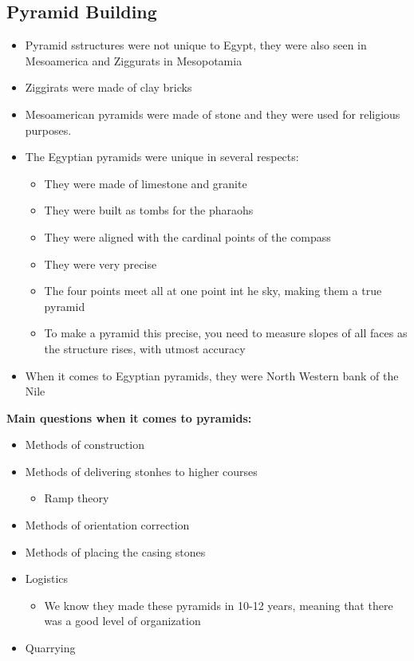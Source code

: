 \documentclass{article}
\begin{document}
\subsection{Pyramid Building}
\begin{itemize}
  \item Pyramid sstructures were not unique to Egypt,
    they were also seen in Mesoamerica and
    Ziggurats in Mesopotamia
  \item Ziggirats were made of clay bricks
  \item Mesoamerican pyramids were made of stone
    and they were used for religious purposes.
  \item The Egyptian pyramids were unique in several respects:
    \begin{itemize}
      \item They were made of limestone and granite
      \item They were built as tombs for the pharaohs
      \item They were aligned with the cardinal points of the compass
      \item They were very precise
      \item The four points meet all at one point int he sky,
        making them a true pyramid
      \item To make a pyramid this precise, you need to measure
        slopes of all faces as the structure rises, with utmost accuracy
      \end{itemize}
    \item When it comes to Egyptian pyramids, they were
      North Western bank of the Nile
\end{itemize}

\newpage
\textbf{Main questions when it comes to pyramids:}
\begin{itemize}
  \item Methods of construction
  \item Methods of delivering stonhes to higher courses
    \begin{itemize}
      \item Ramp theory
    \end{itemize}
  \item Methods of orientation correction
  \item Methods of placing the casing stones
  \item Logistics
    \begin{itemize}
      \item We know they made these pyramids in 10-12 years,
        meaning that there was a good level of organization
    \end{itemize}
  \item Quarrying
\end{itemize}
\end{document}
